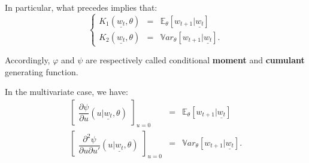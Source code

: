 \documentclass[
  12pt,
]{book}
\theoremstyle{definition}
\theoremstyle{definition}
\theoremstyle{definition}
\theoremstyle{definition}
\theoremstyle{remark}
\begin{document}
In particular, what precedes implies that:
\[
\left\{
\begin{array}{ccc}
K_1(\underline{w_t},\theta) &=& \mathbb{E}_{\theta}[w_{t+1}|\underline{w_t}]\\
K_2(\underline{w_t}, \theta) &=& \mathbb{V}ar_{\theta}[w_{t+1}|\underline{w_t}].
\end{array}
\right.
\]

Accordingly, \(\varphi\) and \(\psi\) are respectively called conditional \textbf{moment} and \textbf{cumulant} generating function.

In the multivariate case, we have:
\begin{eqnarray*}
\left[\begin{array}{l}  \dfrac{\partial \psi}{\partial
u} (u|\underline{w_t},\theta)  \end{array} \right]_{u=0} &=& \mathbb{E}_{\theta}[w_{t+1}|\underline{w_t}] \\
\left[\begin{array}{l}  \dfrac{\partial^2
\psi}{\partial u\partial u'} (u|\underline{w_t},\theta)  \end{array}
\right]_{u=0} &=& \mathbb{V}ar_{\theta}[w_{t+1}|\underline{w_t}].
\end{eqnarray*}
\end{document}

